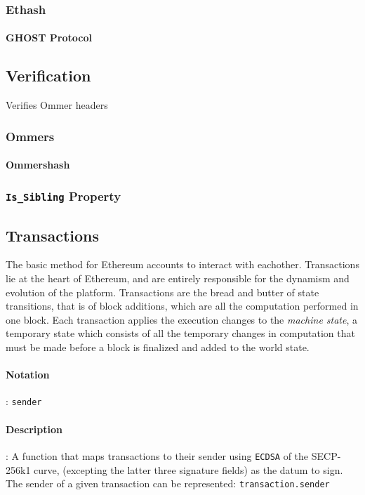 \documentclass[10pt,a4paper,leqno,bibliography=totoc]{scrartcl}
\newenvironment{alphafootnotes}
{\par\edef\savedfootnotenumber{\number\value{footnote}}
\renewcommand{\thefootnote}{\alph{footnote}}
\setcounter{footnote}{0}}
{\par\setcounter{footnote}{\savedfootnotenumber}}
\begin{document}
\begin{alphafootnotes}
\begin{multicols*}{2}
			\subsubsection{Ethash}
	
			\paragraph{GHOST Protocol}

		\subsection{Verification}
		    Verifies Ommer headers

			\subsubsection{Ommers}
				\paragraph{Ommershash}

			\subsubsection{\texttt{Is\_Sibling} Property}

		\subsection{Transactions}
			The basic method for Ethereum accounts to interact with eachother. Transactions lie at the heart of Ethereum, and are entirely responsible for the dynamism and evolution of the platform. Transactions are the bread and butter of state transitions, that is of block additions, which are all the computation performed in one block. Each transaction applies the execution changes to the \textit{machine state}, a temporary state which consists of all the temporary changes in computation that must be made before a block is finalized and added to the world state.
\paragraph{Notation}: \texttt{sender}
\paragraph{Description}: A function that maps transactions to their sender using \texttt{ECDSA} of the SECP-256k1 curve, (excepting the latter three signature fields) as the datum to sign. The sender of a given transaction can be represented:
\texttt{transaction.sender}


\end{multicols*}
\end{alphafootnotes}
\end{document}
